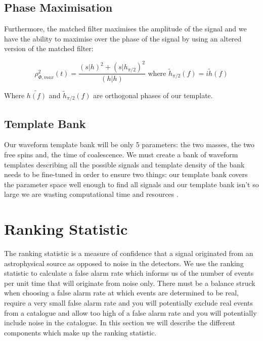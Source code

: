\subsection{\label{2:sec:phase-maximisation}Phase Maximisation}

Furthermore, the matched filter maximises the amplitude of the \gw signal and we have the ability to maximise over the phase of the signal by using an altered version of the matched filter:

\begin{equation}
   \text{$\rho^2_{\Phi,max}(t) = \frac{(s|h)^2 + (s|h_{\pi/2})^2}{(h|h)}$ where $\tilde{h}_{\pi/2}(f) = i \tilde{h}(f)$}
   \label{2:eqn:phase_mf}
\end{equation}

Where $\tilde{h(f)}$ and $\tilde{h}_{\pi/2}(f)$ are orthogonal phases of our template.

\subsection{\label{2:sec:template-bank}Template Bank}

Our waveform template bank will be only 5 parameters: the two masses, the two free spins and, the time of coalescence. We must create a bank of waveform templates describing all the possible signals and template density of the bank needs to be fine-tuned in order to ensure two things: our template bank covers the parameter space well enough to find all signals and our template bank isn't so large we are wasting computational time and resources \cite{Owen_Sathya:1999}.

\section{\label{2:sec:ranking-statistic}Ranking Statistic}
The ranking statistic is a measure of confidence that a signal originated from an astrophysical source as opposed to noise in the detectors. We use the ranking statistic to calculate a false alarm rate which informs us of the number of events per unit time that will originate from noise only. There must be a balance struck when choosing a false alarm rate at which events are determined to be real, require a very small false alarm rate and you will potentially exclude real events from a catalogue and allow too high of a false alarm rate and you will potentially include noise in the catalogue. In this section we will describe the different components which make up the ranking statistic.

